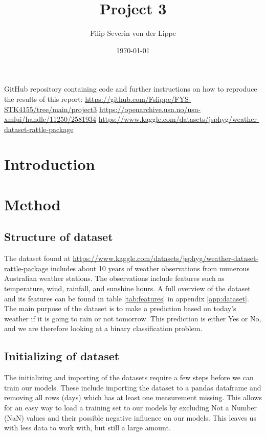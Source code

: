\documentclass[11pt]{article}
\title{Project 3\\ }
\author{Filip Severin von der Lippe}
\date{\today}
\begin{document}
\maketitle
GitHub repository containing code and further instructions on how to reproduce the results of this report: \url{https://github.com/Fslippe/FYS-STK4155/tree/main/project3}
\url{https://openarchive.usn.no/usn-xmlui/handle/11250/2581934}
\url{https://www.kaggle.com/datasets/jsphyg/weather-dataset-rattle-package}
\begin{abstract}
\end{abstract}
\newpage
\tableofcontents
\newpage
\section{Introduction}
\section{Method}
\subsection{Structure of dataset} %
\label{sub:Structure of dataset}

The dataset found at \url{https://www.kaggle.com/datasets/jsphyg/weather-dataset-rattle-package} includes about 10 years of weather observations from numerous Australian weather stations. The observations include features such as temperature, wind, rainfall, and sunshine hours. A full overview of the dataset and its features can be found in table \ref{tab:features} in appendix \ref{app:dataset}. The main purpose of the dataset is to make a prediction based on today's weather if it is going to rain or not tomorrow. This prediction is either Yes or No, and we are therefore looking at a binary classification problem.



\subsection{Initializing of dataset}
The initializing and importing of the datasets require a few steps before we can train our models. These include importing the dataset to a pandas dataframe and removing all rows (days) which has at least one measurement missing. This allows for an easy way to load a training set to our models by excluding Not a Number (NaN) values and their possible negative influence on our models. This leaves us with less data to work with, but still a large amount.
\end{document}
